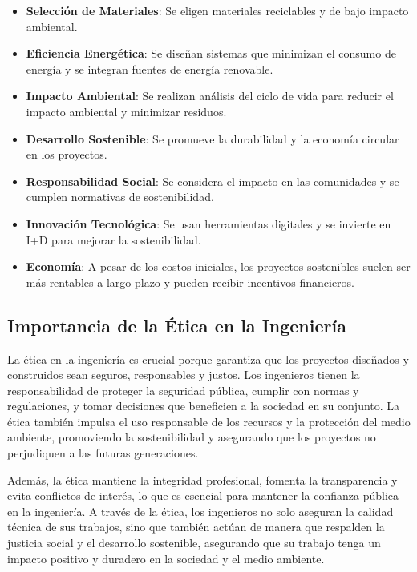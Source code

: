 \documentclass[11pt, a4paper]{article} %
\begin{document}
    \begin{itemize}
        \item \textbf{Selección de Materiales}: Se eligen materiales reciclables y de bajo
            impacto ambiental.

        \item \textbf{Eficiencia Energética}: Se diseñan sistemas que minimizan el consumo
            de energía y se integran fuentes de energía renovable.

        \item \textbf{Impacto Ambiental}: Se realizan análisis del ciclo de vida para reducir
            el impacto ambiental y minimizar residuos.

        \item \textbf{Desarrollo Sostenible}: Se promueve la durabilidad y la economía circular
            en los proyectos.

        \item \textbf{Responsabilidad Social}: Se considera el impacto en las comunidades y
            se cumplen normativas de sostenibilidad.

        \item \textbf{Innovación Tecnológica}: Se usan herramientas digitales y se invierte
            en I+D para mejorar la sostenibilidad.

        \item \textbf{Economía}: A pesar de los costos iniciales, los proyectos
            sostenibles suelen ser más rentables a largo plazo y pueden recibir incentivos
            financieros.
    \end{itemize}

    \subsection{Importancia de la Ética en la Ingeniería}

    La ética en la ingeniería es crucial porque garantiza que los proyectos diseñados y construidos
    sean seguros, responsables y justos. Los ingenieros tienen la responsabilidad de proteger
    la seguridad pública, cumplir con normas y regulaciones, y tomar decisiones que beneficien
    a la sociedad en su conjunto. La ética también impulsa el uso responsable de los
    recursos y la protección del medio ambiente, promoviendo la sostenibilidad y asegurando
    que los proyectos no perjudiquen a las futuras generaciones.

    Además, la ética mantiene la integridad profesional, fomenta la transparencia y evita conflictos
    de interés, lo que es esencial para mantener la confianza pública en la ingeniería. A través
    de la ética, los ingenieros no solo aseguran la calidad técnica de sus trabajos, sino que
    también actúan de manera que respalden la justicia social y el desarrollo sostenible,
    asegurando que su trabajo tenga un impacto positivo y duradero en la sociedad y el
    medio ambiente.


    \nocite{*} %

    \clearpage
    

    
\end{document}
